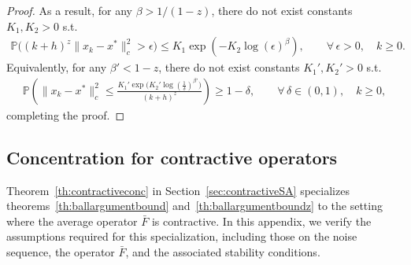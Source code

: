 \documentclass{article}
\newcommand{\lrset}[1]{\left\{ #1 \right\}}
\newcommand{\lrs}[1]{\left[ #1 \right]}
\newcommand{\E}[1]{\mathbb{E}\lrs{#1}}
\newcommand{\R}{\mathbb{R}}
\newcommand{\lcm}{\ell_{cM}}
\newcommand{\ucm}{u_{cM}}
\begin{document}
\begin{proof}
As a result, for any $\beta>1/(1-z)$, there do not exist constants $K_1,K_2>0$ s.t. 
\begin{align*}
    \mathbb{P}\Big((k+h)^z \|x_k-x^*\|_c^2 > \epsilon \Big) \leq K_1\exp\left(-K_2\log(\epsilon)^\beta\right), \qquad \forall\,\epsilon>0, \quad k\geq 0.
\end{align*}
Equivalently, for any $\beta'<1-z$, there do not exist constants $K_1',K_2'>0$ s.t. 
\begin{align*}
    \mathbb{P}\left(\|x_k-x^*\|_c^2 \leq \frac{K_1' \exp\Big(K_2'\log\left(\frac{1}{\delta}\right)^{\beta'}\Big)}{(k+h)^z} \right) \geq 1- \delta,\qquad \forall\,\delta\in(0,1), \quad k\geq 0,
\end{align*}
completing the proof.
\end{proof}


\subsection{Concentration for contractive operators}\label{app:conc_contraction}
Theorem~\ref{th:contractiveconc} in Section~\ref{sec:contractiveSA} specializes theorems~\ref{th:ballargumentbound} and~\ref{th:ballargumentboundz} to the setting where the average operator $\bar{F}$ is contractive. In this appendix, we verify the assumptions required for this specialization, including those on the noise sequence, the operator $\bar{F}$, and the associated stability conditions.
\end{document}
